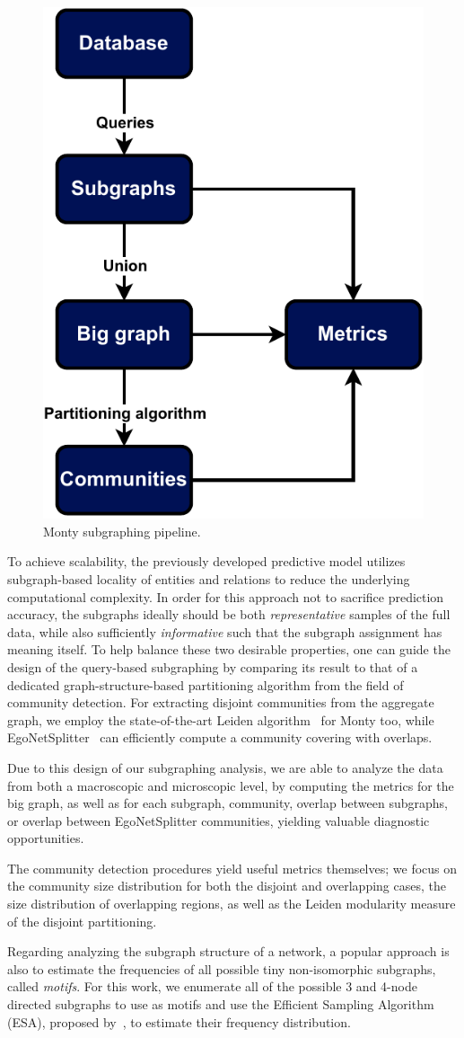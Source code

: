 \begin{figure}[H]
\centering
\includegraphics[width=0.35\columnwidth]{figures/swisscom/subgraphing.pdf}
\caption[Monty subgraphing pipeline.]{Monty subgraphing pipeline.}
\label{fig:subgraphing}
\end{figure}

To achieve scalability, the previously developed predictive model utilizes subgraph-based locality of entities and relations to reduce the underlying computational complexity. In order for this approach not to sacrifice prediction accuracy, the subgraphs ideally should be both \emph{representative} samples of the full data, while also sufficiently \emph{informative} such that the subgraph assignment has meaning itself. To help balance these two desirable properties, one can guide the design of the query-based subgraphing by comparing its result to that of a dedicated graph-structure-based partitioning algorithm from the field of community detection. For extracting disjoint communities from the aggregate graph, we employ the state-of-the-art Leiden algorithm~\cite{traag_louvain_2019} for Monty too, while EgoNetSplitter~\cite{epasto_ego-splitting_2017} can efficiently compute a community covering with overlaps.

Due to this design of our subgraphing analysis, we are able to analyze the data from both a macroscopic and microscopic level, by computing the metrics for the big graph, as well as for each subgraph, community, overlap between subgraphs, or overlap between EgoNetSplitter communities, yielding valuable diagnostic opportunities.

The community detection procedures yield useful metrics themselves; we focus on the community size distribution for both the disjoint and overlapping cases, the size distribution of overlapping regions, as well as the Leiden modularity measure of the disjoint partitioning.

Regarding analyzing the subgraph structure of a network, a popular approach is also to estimate the frequencies of all possible tiny non-isomorphic subgraphs, called \emph{motifs}. For this work, we enumerate all of the possible 3 and 4-node directed subgraphs to use as motifs and use the Efficient Sampling Algorithm (ESA), proposed by~\cite{kashtan_efficient_2004}, to estimate their frequency distribution.  

